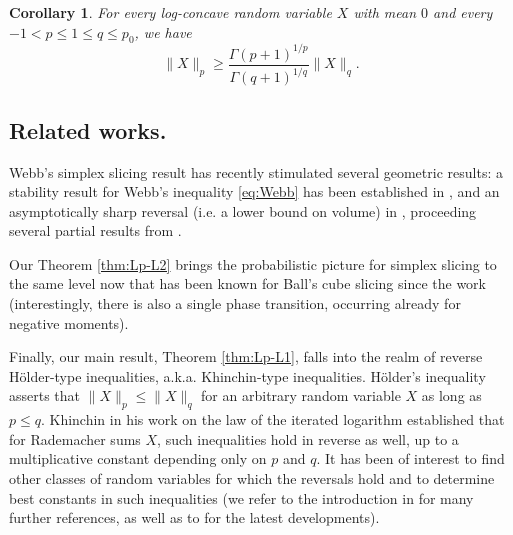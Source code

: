 \documentclass[10pt]{amsart}
\newcommand{\1}{\textbf{1}}
\newtheorem{corollary}[theorem]{Corollary}
\theoremstyle{remark}
\theoremstyle{definition}
\begin{document}
\begin{corollary}\label{cor:Lp-Lq}
For every log-concave random variable $X$ with mean $0$ and every $-1 < p \leq 1 \leq q \leq p_0$, we have
\begin{equation}\label{eq:Lp-Lq}
\|X\|_p \geq \frac{\Gamma(p+1)^{1/p}}{\Gamma(q+1)^{1/q}}\|X\|_q.
 \end{equation}
\end{corollary}








\subsection{Related works.}
Webb's simplex slicing result has recently stimulated several geometric results: a stability result for Webb's inequality \eqref{eq:Webb} has been established in \cite{MTTT}, and an asymptotically sharp reversal (i.e. a lower bound on volume) in \cite{Tang}, proceeding several partial results from \cite{Brz, Dirk}.

Our Theorem \ref{thm:Lp-L2} brings the probabilistic picture for simplex slicing to the same level now that has been known for Ball's cube slicing since the work \cite{CKT} (interestingly, there is also a single phase transition, occurring already for negative moments). 

Finally, our main result, Theorem \ref{thm:Lp-L1}, falls into the realm of reverse H\"older-type inequalities, a.k.a. Khinchin-type inequalities. H\"older's inequality asserts that $\|X\|_p \leq \|X\|_q$  for an arbitrary random variable $X$ as long as $p \leq q$. Khinchin in his work on the law of the iterated logarithm \cite{Khin} established that for Rademacher sums $X$, such inequalities hold in reverse as well, up to a multiplicative constant depending only on $p$ and $q$. It has been of interest to find other classes of random variables for which the reversals hold and to determine best constants in such inequalities (we refer to the introduction in \cite{HT} for many further references, as well as to \cite{BMNO} for the latest developments).
\end{document}
